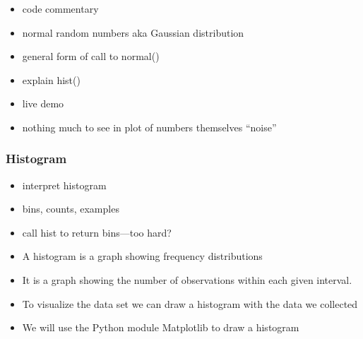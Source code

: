 \documentclass[english,14pt]{beamer}
\begin{document}

\begin{frame}[fragile]

\frametitle{}

\begin{itemize}
	\item code commentary
	\item normal random numbers aka Gaussian distribution
	\item general form of call to normal()
	\item explain hist()
	\item live demo
	\item nothing much to see in plot of numbers themselves ``noise'' 
\end{itemize}

\end{frame}


\begin{frame}[fragile]

\frametitle{Histogram}

\begin{itemize}
	\item interpret histogram
	\item bins, counts, examples
	\item call hist to return bins---too hard?
\end{itemize}

\begin{itemize}
	\item A histogram is a graph showing frequency distributions
	\item It is a graph showing the number of observations within each given interval.
	\item To visualize the data set we can draw a histogram with the data we collected
	\item We will use the Python module Matplotlib to draw a histogram
\end{itemize}

\end{frame}

\end{document}

